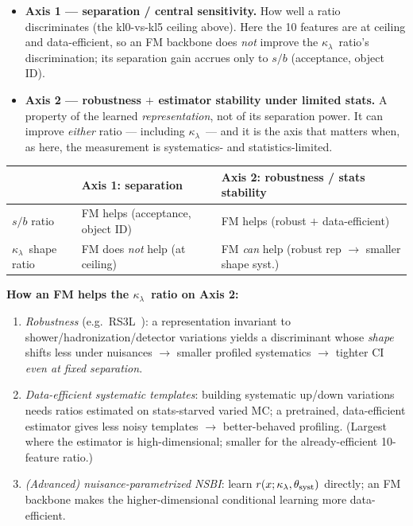 \documentclass[11pt]{article}
\newcommand{\kl}{\ensuremath{\kappa_\lambda}}
\begin{document}
\begin{itemize}
\item \textbf{Axis 1 --- separation / central sensitivity.} How well a ratio
  discriminates (the kl0-vs-kl5 ceiling above). Here the 10 features are at ceiling and
  data-efficient, so an FM backbone does \emph{not} improve the \kl\ ratio's
  discrimination; its separation gain accrues only to $s/b$ (acceptance, object ID).
\item \textbf{Axis 2 --- robustness $+$ estimator stability under limited stats.} A
  property of the learned \emph{representation}, not of its separation power. It can
  improve \emph{either} ratio --- including \kl\ --- and it is the axis that matters
  when, as here, the measurement is systematics- and statistics-limited.
\end{itemize}

\begin{table}[h]
\centering\small
\begin{tabular}{@{}lll@{}}
\toprule
 & \textbf{Axis 1: separation} & \textbf{Axis 2: robustness / stats stability} \\
\midrule
$s/b$ ratio & FM helps (acceptance, object ID) & FM helps (robust $+$ data-efficient) \\
\kl\ shape ratio & FM does \emph{not} help (at ceiling) & FM \emph{can} help (robust rep
$\to$ smaller shape syst.) \\
\bottomrule
\end{tabular}
\end{table}

\noindent\textbf{How an FM helps the \kl\ ratio on Axis 2:}
\begin{enumerate}[leftmargin=1.4em]
\item \emph{Robustness} (e.g.\ RS3L~\cite{rs3l}): a representation invariant to
  shower/hadronization/detector variations yields a discriminant whose \emph{shape}
  shifts less under nuisances $\to$ smaller profiled systematics $\to$ tighter CI
  \emph{even at fixed separation}.
\item \emph{Data-efficient systematic templates}: building systematic up/down variations
  needs ratios estimated on stats-starved varied MC; a pretrained, data-efficient
  estimator gives less noisy templates $\to$ better-behaved profiling. (Largest where
  the estimator is high-dimensional; smaller for the already-efficient 10-feature ratio.)
\item \emph{(Advanced) nuisance-parametrized NSBI}: learn $r(x;\kl,\theta_{\rm syst})$
  directly; an FM backbone makes the higher-dimensional conditional learning more
  data-efficient.
\end{enumerate}
\end{document}
